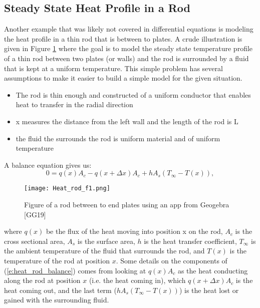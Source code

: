 \documentclass[twoside]{article}
\renewcommand{\cite}[1]{[#1]}
\def\ds{\displaystyle}
\begin{document}
\subsection{Steady State Heat Profile in a Rod}
Another example that was likely not covered in differential equations is modeling the heat profile in a thin rod that is between to plates. A crude illustration is given in Figure \ref{f:heat_rod_f1} where the goal is to model the steady state temperature profile of a thin rod between two plates (or walls) and the rod is surrounded by a fluid that is kept at a uniform temperature. This simple problem has several assumptions to make it easier to build a simple model for the given situation. 
\begin{itemize}
\item{} The rod is thin enough and constructed of a uniform conductor that enables heat to transfer in the radial direction
\item{} x measures the distance from the left wall and the length of the rod is L
\item{} the fluid the surrounds the rod is uniform material and of uniform temperature
\end{itemize}
A balance equation gives us:
\begin{equation}
0=q(x) A_c - q(x+\Delta x) A_c + h A_s(T_{\infty}-T(x)),
\label{e:heat_rod_balance}
\end{equation}

\begin{figure}[!ht]
\centering
\texttt{[image: Heat\_rod\_f1.png]}
\caption{Figure of a rod between to end plates using an app from Geogebra \cite{GG19}}\label{f:heat_rod_f1}
\end{figure}
where $\ds q(x)$ be the flux of the heat moving into position x on the rod, $\ds A_c$ is the cross sectional area, $\ds A_s$ is the surface area, $h$ is the heat transfer coefficient, $\ds T_{\infty}$ is the ambient temperature of the fluid that surrounds the rod, and $T(x)$ is the temperature of the rod at position $x$. Some details on the components of (\ref{e:heat_rod_balance}) comes from looking at $\ds q(x)A_c$ as the heat conducting along the rod at position $x$ (i.e. the heat coming in), which $\ds q(x+\Delta x)A_c$ is the heat coming out, and the last term ($\ds h A_s(T_{\infty} - T(x))$) is the heat lost or gained with the surrounding fluid.
\end{document}
